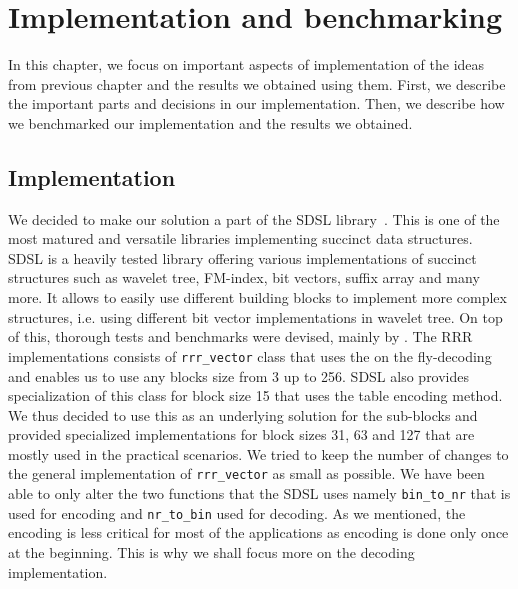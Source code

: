 \chapter{Implementation and benchmarking}
\label{kap:kap4}

In this chapter, we focus on important aspects of implementation of the ideas from
previous chapter and the results we obtained using them. First, we describe the
important parts and decisions in our implementation. Then, we describe how we
benchmarked our implementation and the results we obtained.

\section{Implementation}

We decided to make our solution a part of the SDSL library~\citep{gog2014theory}. This
is one of the most matured and versatile libraries implementing succinct data structures.
SDSL is a heavily tested library offering various implementations of succinct
structures such as wavelet tree, FM-index, bit vectors, suffix array and many more.
It allows to easily use different building blocks to implement more complex structures,
i.e. using different bit vector implementations in wavelet tree. On top of this, thorough
tests and benchmarks were devised, mainly by \cite{gog2014optimized}.
The RRR implementations consists of \texttt{rrr\_vector} class that uses the on the fly-decoding
and enables us to use any blocks size from 3 up to 256. SDSL also provides specialization
of this class for block size 15 that uses the table encoding method. We thus decided to use
this as an underlying solution for the sub-blocks and provided specialized implementations
for block sizes 31, 63 and 127 that are mostly used in the practical scenarios. We tried to
keep the number of changes to the general implementation of \texttt{rrr\_vector} as small as possible.
We have been able to only alter the two functions that the SDSL uses namely \texttt{bin\_to\_nr}
that is used for encoding and \texttt{nr\_to\_bin} used for decoding. As we mentioned, the encoding
is less critical for most of the applications as encoding is done only once at the beginning.
This is why we shall focus more on the decoding implementation.

